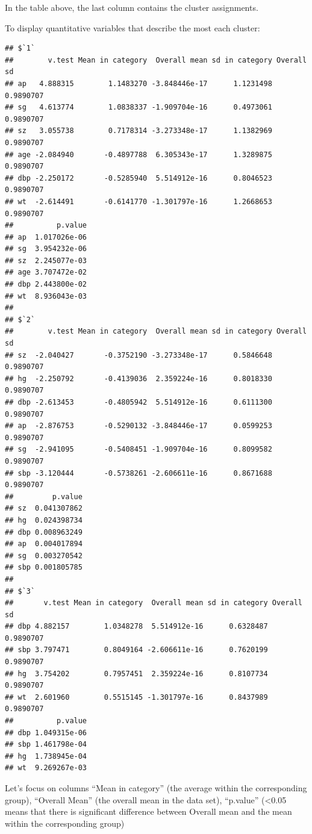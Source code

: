\documentclass[
]{article}
\newenvironment{Shaded}{\begin{snugshade}}{\end{snugshade}}
\newcommand{\NormalTok}[1]{#1}
\newcommand{\SpecialCharTok}[1]{\textcolor[rgb]{0.00,0.00,0.00}{#1}}
\begin{document}
In the table above, the last column contains the cluster assignments.

To display quantitative variables that describe the most each cluster:

\begin{Shaded}
\end{Shaded}

\begin{verbatim}
## $`1`
##        v.test Mean in category  Overall mean sd in category Overall sd
## ap   4.888315        1.1483270 -3.848446e-17      1.1231498  0.9890707
## sg   4.613774        1.0838337 -1.909704e-16      0.4973061  0.9890707
## sz   3.055738        0.7178314 -3.273348e-17      1.1382969  0.9890707
## age -2.084940       -0.4897788  6.305343e-17      1.3289875  0.9890707
## dbp -2.250172       -0.5285940  5.514912e-16      0.8046523  0.9890707
## wt  -2.614491       -0.6141770 -1.301797e-16      1.2668653  0.9890707
##          p.value
## ap  1.017026e-06
## sg  3.954232e-06
## sz  2.245077e-03
## age 3.707472e-02
## dbp 2.443800e-02
## wt  8.936043e-03
## 
## $`2`
##        v.test Mean in category  Overall mean sd in category Overall sd
## sz  -2.040427       -0.3752190 -3.273348e-17      0.5846648  0.9890707
## hg  -2.250792       -0.4139036  2.359224e-16      0.8018330  0.9890707
## dbp -2.613453       -0.4805942  5.514912e-16      0.6111300  0.9890707
## ap  -2.876753       -0.5290132 -3.848446e-17      0.0599253  0.9890707
## sg  -2.941095       -0.5408451 -1.909704e-16      0.8099582  0.9890707
## sbp -3.120444       -0.5738261 -2.606611e-16      0.8671688  0.9890707
##         p.value
## sz  0.041307862
## hg  0.024398734
## dbp 0.008963249
## ap  0.004017894
## sg  0.003270542
## sbp 0.001805785
## 
## $`3`
##       v.test Mean in category  Overall mean sd in category Overall sd
## dbp 4.882157        1.0348278  5.514912e-16      0.6328487  0.9890707
## sbp 3.797471        0.8049164 -2.606611e-16      0.7620199  0.9890707
## hg  3.754202        0.7957451  2.359224e-16      0.8107734  0.9890707
## wt  2.601960        0.5515145 -1.301797e-16      0.8437989  0.9890707
##          p.value
## dbp 1.049315e-06
## sbp 1.461798e-04
## hg  1.738945e-04
## wt  9.269267e-03
\end{verbatim}

Let's focus on columns ``Mean in category'' (the average within the
corresponding group), ``Overall Mean'' (the overall mean in the data
set), ``p.value'' (\textless0.05 means that there is significant
difference between Overall mean and the mean within the corresponding
group)
\end{document}
